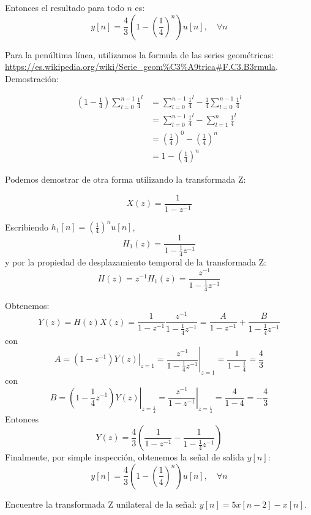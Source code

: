 \documentclass[addpoints,answers]{exam}
\begin{document}
\begin{questions}
\begin{solution}
Entonces el resultado para todo \(n\) es:
\[
	y[n]	= \frac{4}{3}\left(1-\left(\frac{1}{4}\right)^n\right) u[n], \quad \forall n
\]

Para la penúltima línea, utilizamos la formula de las series geométricas: \url{https://es.wikipedia.org/wiki/Serie_geom%C3%A9trica#F.C3.B3rmula}. Demostración:

\[
\begin{array}{ll}
\left(1-\frac{1}{4}\right)\sum_{l=0}^{n-1}\frac{1}{4}^{l} &= \sum_{l=0}^{n-1}\frac{1}{4}^{l} -\frac{1}{4}\sum_{l=0}^{n-1}\frac{1}{4}^{l} \\
&= \sum_{l=0}^{n-1}\frac{1}{4}^{l} -\sum_{l=1}^{n}\frac{1}{4}^{l} \\
&= \left(\frac{1}{4}\right)^{0} - \left(\frac{1}{4}\right)^{n} \\
&= 1 - \left(\frac{1}{4}\right)^{n}
\end{array}
\]




Podemos demostrar de otra forma utilizando la transformada Z:

\[
X(z) = \frac{1}{1-z^{-1}}
\]

Escribiendo \(h_1[n]=\left(\frac{1}{4}\right)^n u[n]\),
\[
H_1(z) = \frac{1}{1-\frac{1}{4}z^{-1}}
\]
y por la propiedad de desplazamiento temporal de la transformada Z:
\[
H(z) = z^{-1}H_1(z) = \frac{z^{-1}}{1-\frac{1}{4}z^{-1}}
\]

Obtenemos:
\[
Y(z) = H(z)X(z) = \frac{1}{1-z^{-1}}\frac{z^{-1}}{1-\frac{1}{4}z^{-1}} = \frac{A}{1-z^{-1}} + \frac{B}{1-\frac{1}{4}z^{-1}}
\]
con
\[
A = \left.\left(1-z^{-1}\right)Y(z)\right|_{z=1} = \left.\frac{z^{-1}}{1-\frac{1}{4}z^{-1}}\right|_{z=1} = \frac{1}{1-\frac{1}{4}} = \frac{4}{3}
\]
con
\[
B = \left.\left(1-\frac{1}{4}z^{-1}\right)Y(z)\right|_{z=\frac{1}{4}} = \left.\frac{z^{-1}}{1-z^{-1}}\right|_{z=\frac{1}{4}} = \frac{4}{1-4} = -\frac{4}{3}
\]
Entonces
\[
Y(z) = \frac{4}{3}\left(\frac{1}{1-z^{-1}} - \frac{1}{1-\frac{1}{4}z^{-1}}\right)
\]
Finalmente, por simple inspección, obtenemos la señal de salida \(y[n]\):
\[
y[n] = \frac{4}{3}\left(1-\left(\frac{1}{4}\right)^n\right)u[n], \quad \forall n
\]

\end{solution}
\question[10]
Encuentre la transformada Z unilateral de la señal: \(y[n] = 5 x[n-2] - x[n]\).


\end{questions}
\end{document}
